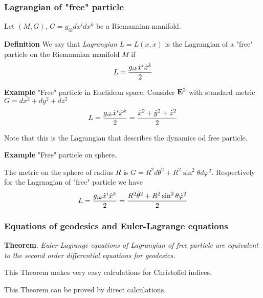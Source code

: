 \documentclass[12pt]{article}
\theoremstyle{theorem}
\numberwithin{equation}{section}
\begin{document}
{    \subsubsection {Lagrangian of "free" particle}


     Let $(M,G)$, $G=g_{ik}dx^idx^k$ be a Riemannian manifold.


     {\bf Definition} We say that {\it Lagrangian} $L=L(x,\dot x)$ is the Lagrangian of a "free" particle on the
     Riemannian manifold $M$ if
      \begin{equation}\label{frepaticlelagrangian}
        L={g_{ik}\dot x^i\dot x^k\over 2}
      \end{equation}

{\bf Example} "Free" particle in Euclidean space.
    Consider ${\bf E}^3$ with standard metric $G=dx^2+dy^2+dz^2$
      \begin{equation}\label{freeparticleineuclideanspace}
        L={g_{ik}\dot x^i\dot x^k\over 2}={\dot x^2+\dot y^2+\dot z^2\over 2}
      \end{equation}

Note that this is the Lagrangian that describes the dynamics od free particle.

\m

{\bf Example} "Free" particle on sphere.

The metric on the sphere of radius $R$ is
$G=R^2d\theta^2+R^2\sin^2\theta d\varphi^2$.
Respectively for the Lagrnagian of "free" particle we have
\begin{equation}\label{freeparticleonthesphere}
        L={g_{ik}\dot x^i\dot x^k\over 2}={R^2\dot\theta^2+R^2\sin^2\theta\dot \varphi^2\over 2}
      \end{equation}


\m
\subsubsection {Equations of geodesics and Euler-Lagrange equations}

{\bf Theorem}. {\it Euler-Lagrange equations of Lagrangian of free particle are equivalent
to the second order differential equations
for geodesics.}

This Theorem makes very easy calculations for Christoffel indices.

\m

 This Theorem can be proved by direct calculations.

}
\end{document}
